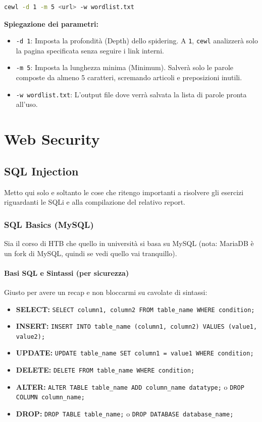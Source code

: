 \documentclass[12pt,a4paper]{report}
\begin{document}
	\begin{lstlisting}[language=bash]
		cewl -d 1 -m 5 <url> -w wordlist.txt
	\end{lstlisting}
	
	\textbf{Spiegazione dei parametri:}\\
	\begin{itemize}
		\item \texttt{-d 1}: Imposta la profondità (Depth) dello spidering. A \texttt{1}, \texttt{cewl} analizzerà solo la pagina specificata senza seguire i link interni.
		\item \texttt{-m 5}: Imposta la lunghezza minima (Minimum). Salverà solo le parole composte da almeno 5 caratteri, scremando articoli e preposizioni inutili.
		\item \texttt{-w wordlist.txt}: L'output file dove verrà salvata la lista di parole pronta all'uso.
	\end{itemize}
	
	\chapter{Web Security}
	
	\section{SQL Injection}
	
	Metto qui solo e soltanto le cose che ritengo importanti a risolvere gli esercizi riguardanti le SQLi e alla compilazione del relativo report.
	
	\subsection{SQL Basics (MySQL)}
	Sia il corso di HTB che quello in università si basa su MySQL (nota: MariaDB è un fork di MySQL, quindi se vedi quello vai tranquillo). 
	
	\subsubsection{Basi SQL e Sintassi (per sicurezza)}
	Giusto per avere un recap e non bloccarmi su cavolate di sintassi:
	\begin{itemize}
		\item \textbf{SELECT:} \texttt{SELECT column1, column2 FROM table\_name WHERE condition;}
		\item \textbf{INSERT:} \texttt{INSERT INTO table\_name (column1, column2) VALUES (value1, value2);}
		\item \textbf{UPDATE:} \texttt{UPDATE table\_name SET column1 = value1 WHERE condition;}
		\item \textbf{DELETE:} \texttt{DELETE FROM table\_name WHERE condition;}
		\item \textbf{ALTER:} \texttt{ALTER TABLE table\_name ADD column\_name datatype;} o \texttt{DROP COLUMN column\_name;}
		\item \textbf{DROP:} \texttt{DROP TABLE table\_name;} o \texttt{DROP DATABASE database\_name;}
	\end{itemize}
	
\end{document}
